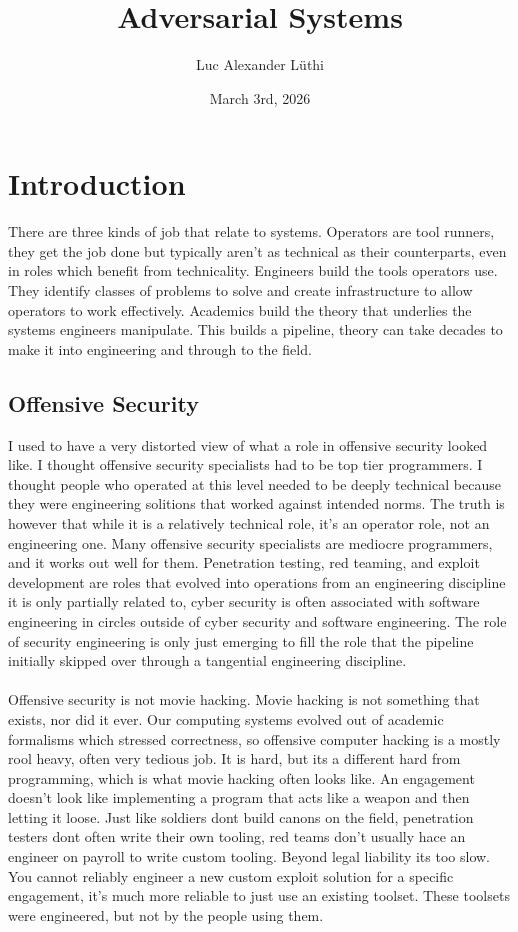 \documentclass{article}
\title{Adversarial Systems}
\author{Luc Alexander L{\"u}thi}
\date{March 3rd, 2026}
\begin{document}
	\maketitle
	\tableofcontents
	\section{Introduction}
	There are three kinds of job that relate to systems. Operators are tool runners, they get the job done but typically aren't as technical as their counterparts, even in roles which benefit from technicality. Engineers build the tools operators use. They identify classes of problems to solve and create infrastructure to allow operators to work effectively. Academics build the theory that underlies the systems engineers manipulate. This builds a pipeline, theory can take decades to make it into engineering and through to the field. 
	\subsection{Offensive Security}
	I used to have a very distorted view of what a role in offensive security looked like. I thought offensive security specialists  had to be top tier programmers. I thought people who operated at this level needed to be deeply technical because they were engineering solitions that worked against intended norms. The truth is however that while it is a relatively technical role, it's an operator role, not an engineering one. Many offensive security specialists are mediocre programmers, and it works out well for them. Penetration testing, red teaming, and exploit development are roles that evolved into operations from an engineering discipline it is only partially related to, cyber security is often associated with software engineering in circles outside of cyber security and software engineering. The role of security engineering is only just emerging to fill the role that the pipeline initially skipped over through a tangential engineering discipline.\\\\
	Offensive security is not movie hacking. Movie hacking is not something that exists, nor did it ever. Our computing systems evolved out of academic formalisms which stressed correctness, so offensive computer hacking is a mostly rool heavy, often very tedious job. It is hard, but its a different hard from programming, which is what movie hacking often looks like. An engagement doesn't look like implementing a program that acts like a weapon and then letting it loose. Just like soldiers dont build canons on the field, penetration testers dont often write their own tooling, red teams don't usually hace an engineer on payroll to write custom tooling. Beyond legal liability its too slow. You cannot reliably engineer a new custom exploit solution for a specific engagement, it's much more reliable to just use an existing toolset. These toolsets were engineered, but not by the people using them.
\end{document}
